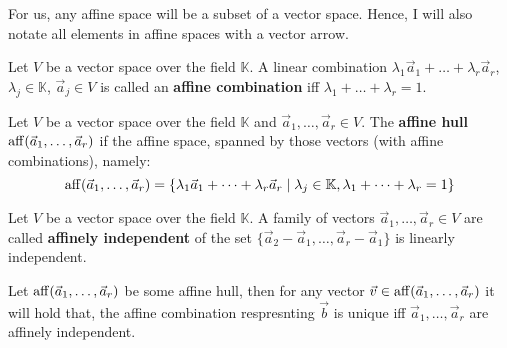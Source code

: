 For us, any affine space will be a subset of a vector space. Hence, I will also notate all elements in affine spaces with a vector arrow. 

\begin{definition}
    Let $V$ be a vector space over the field $\mathbb{K}$. A linear combination $\lambda_1 \vec a_1 + \dots + \lambda_r \vec a_r$, $\lambda_j \in \mathbb{K}$, $\vec a_j \in V$ is called an \textbf{affine combination} iff $\lambda_1 + \dots + \lambda_r = 1$.
\end{definition}
    
\begin{definition}
    Let $V$ be a vector space over the field $\mathbb{K}$ and $\vec a_1, \dots, \vec a_r \in V$. The \textbf{affine hull} $\operatorname{aff}(\vec a_1, \dots, \vec a_r)$ if the affine space, spanned by those vectors (with affine combinations), namely:
    $$\operatorname{aff}(\vec a_1, \dots, \vec a_r) = \{\lambda_1 \vec a_1 + \dots + \lambda_r \vec a_r \mid \lambda_j \in \mathbb{K}, \lambda_1 + \dots + \lambda_r = 1\}$$
\end{definition}
\begin{definition}
    Let $V$ be a vector space over the field $\mathbb{K}$. A family of vectors $\vec a_1, \dots, \vec a_r \in V$ are called \textbf{affinely independent} of the set $\{\vec a_2 - \vec a_1, \dots, \vec a_r - \vec a_1\}$ is linearly independent.
\end{definition}
\begin{observation}
    Let $\operatorname{aff}(\vec a_1, \dots, \vec a_r)$ be some affine hull, then for any vector $\vec v \in \operatorname{aff}(\vec a_1, \dots, \vec a_r)$ it will hold that, the affine combination respresnting $\vec b$ is unique iff $\vec a_1, \dots, \vec a_r$ are affinely independent.
\end{observation}

